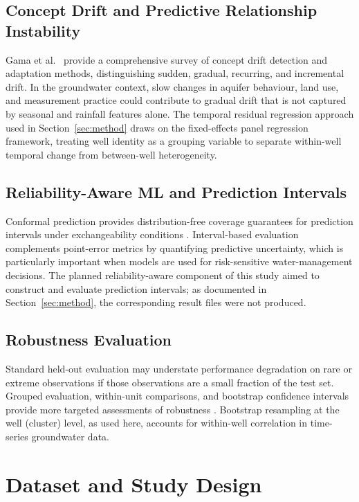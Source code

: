 \documentclass[conference]{IEEEtran}
\begin{document}
\subsection{Concept Drift and Predictive Relationship Instability}

Gama et al.~\cite{gama2014survey} provide a comprehensive survey of
concept drift detection and adaptation methods, distinguishing sudden,
gradual, recurring, and incremental drift.
In the groundwater context, slow changes in aquifer behaviour, land use,
and measurement practice could contribute to gradual drift that is not
captured by seasonal and rainfall features alone.
The temporal residual regression approach used in Section~\ref{sec:method}
draws on the fixed-effects panel regression framework, treating well
identity as a grouping variable to separate within-well temporal change
from between-well heterogeneity.

\subsection{Reliability-Aware ML and Prediction Intervals}

Conformal prediction provides distribution-free coverage guarantees for
prediction intervals under exchangeability
conditions \cite{vovk2005algorithmic}.
Interval-based evaluation complements point-error metrics by quantifying
predictive uncertainty, which is particularly important when models are
used for risk-sensitive water-management decisions.
The planned reliability-aware component of this study aimed to construct
and evaluate prediction intervals; as documented in
Section~\ref{sec:method}, the corresponding result files were not
produced.

\subsection{Robustness Evaluation}

Standard held-out evaluation may understate performance degradation on
rare or extreme observations if those observations are a small fraction
of the test set.
Grouped evaluation, within-unit comparisons, and bootstrap confidence
intervals provide more targeted assessments of robustness \cite{efron1993bootstrap}.
Bootstrap resampling at the well (cluster) level, as used here, accounts
for within-well correlation in time-series groundwater data.

\section{Dataset and Study Design}
\label{sec:data}
\end{document}
